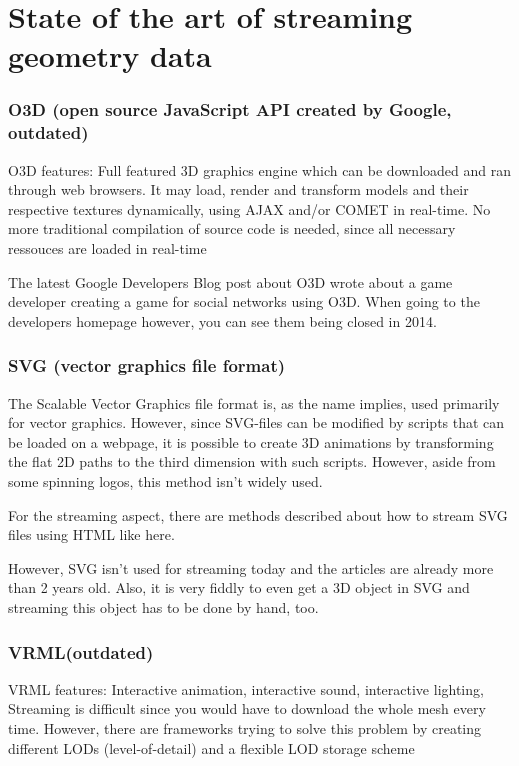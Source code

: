 \documentclass[%
aip,
jmp,
amsmath,amssymb,
reprint,
nofootinbib
]{revtex4-1}
\begin{document}
	\section{State of the art of streaming geometry data}
	
	\subsubsection{O3D (open source JavaScript API created by Google, outdated)}
	
	O3D features: Full featured 3D graphics engine which can be downloaded and ran through web browsers. It may load, render and transform models and their respective textures dynamically, using AJAX and/or COMET in real-time. No more traditional compilation of source code is needed, since all necessary ressouces are loaded in real-time
	
	The latest Google Developers Blog post about O3D wrote about a game developer creating a game for social networks using O3D. When going to the developers homepage however, you can see them being closed in 2014.
	
	\subsubsection{SVG (vector graphics file format)}
	
	The Scalable Vector Graphics file format is, as the name implies, used primarily for vector graphics. However, since SVG-files can be modified by scripts that can be loaded on a webpage, it is possible to create 3D animations by transforming the flat 2D paths to the third dimension with such scripts. However, aside from some spinning logos, this method isn't widely used.
	
	For the streaming aspect, there are methods described about how to stream SVG files using HTML like here.
	
	However, SVG isn't used for streaming today and the articles are already more than 2 years old. Also, it is very fiddly to even get a 3D object in SVG and streaming this object has to be done by hand, too.
	
	\subsubsection{VRML(outdated)}
	
	VRML features: Interactive animation, interactive sound, interactive lighting, Streaming is difficult since you would have to download the whole mesh every time. However, there are frameworks trying to solve this problem by creating different LODs (level-of-detail) and a flexible LOD storage scheme
	
\end{document}
